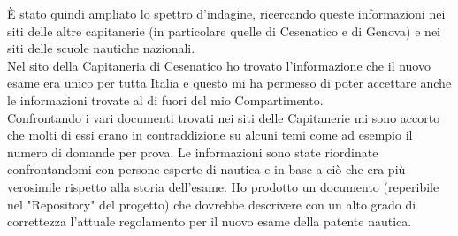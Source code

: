 È stato quindi ampliato lo spettro d'indagine, ricercando queste informazioni nei siti delle altre capitanerie (in particolare quelle di Cesenatico e di Genova) e nei siti delle scuole nautiche nazionali.\\
Nel sito della Capitaneria di Cesenatico ho trovato l'informazione che il nuovo esame era unico per tutta Italia e questo mi ha permesso di poter accettare anche le informazioni trovate al di fuori del mio Compartimento.\\
Confrontando i vari documenti trovati nei siti delle Capitanerie mi sono accorto che molti di essi erano in contraddizione su alcuni temi come ad esempio il numero di domande per prova. Le informazioni sono state riordinate confrontandomi con persone esperte di nautica e in base a ciò che era più verosimile rispetto alla storia dell'esame. Ho prodotto un documento (reperibile nel "Repository" del progetto) che dovrebbe descrivere con un alto grado di correttezza l'attuale regolamento per il nuovo esame della patente nautica.\\
